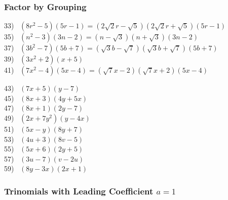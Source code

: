 \documentclass[12pt]{book}
\theoremstyle{definition}
\begin{document}
\subsubsection{Factor by Grouping}


33)~ $(8r^2-5)(5r-1)=\left(2\sqrt{2}r-\sqrt{5}\right)\left(2\sqrt{2}r+\sqrt{5}\right)(5r-1)$\\
35)~ $(n^2-3)(3n-2)=\left(n-\sqrt{3}\right)\left(n+\sqrt{3}\right)(3n-2)$\\
37)~ $(3b^2-7)(5b+7)=\left(\sqrt{3}b-\sqrt{7}\right)\left(\sqrt{3}b+\sqrt{7}\right)(5b+7)$\\
39)~ $(3x^2+2)(x+5)$\\
41)~ $(7x^2-4)(5x-4)=\left(\sqrt{7}x-2\right)\left(\sqrt{7}x+2\right)(5x-4)$%
\begin{multicols}{3}
43)~ $(7x+5)(y-7)$\\
45)~ $(8x+3)(4y+5x)$\\
47)~ $(8x+1)(2y-7)$\\
49)~ $(2x+7y^2)(y-4x)$\\
51)~ $(5x-y)(8y+7)$\\
53)~ $(4u+3)(8v-5)$\\
55)~ $(5x+6)(2y+5)$\\
57)~ $(3u-7)(v-2u)$\\
59)~ $(8y-3x)(2x+1)$%
\end{multicols}

\subsubsection{Trinomials with Leading Coefficient $a=1$}
\end{document}
